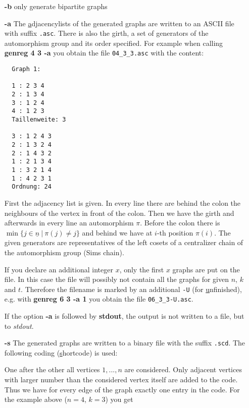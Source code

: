 \documentclass[11pt]{article}
\begin{document}
\begin{itemize}

 \item[\bf -b] only generate bipartite graphs

 \item[\bf -a]
  The \underline{a}djacencylists of the generated graphs are
  written to an ASCII file with suffix \verb|.asc|. There is
  also the girth, a set of generators of the automorphism group
  and its order specified. For example when calling 
  {\bf genreg 4 3 -a} you obtain the file \verb|04_3_3.asc| with the content:
  \begin{verbatim}
  Graph 1:

  1 : 2 3 4
  2 : 1 3 4
  3 : 1 2 4
  4 : 1 2 3
  Taillenweite: 3

  3 : 1 2 4 3
  2 : 1 3 2 4
  2 : 1 4 3 2
  1 : 2 1 3 4
  1 : 3 2 1 4
  1 : 4 2 3 1
  Ordnung: 24 \end{verbatim}
  First the adjacency list is given. In every line there are
  behind the colon the neighbours of the vertex in front
  of the colon. Then we have the girth and afterwards in every
  line an automorphism $\pi$. Before the colon there is 
  $\min\{j \in \underline{n}\ |\ \pi(j)\not=j \}$ and behind
  we have at $i$-th position $\pi(i)$. The given generators
  are representatives of the left cosets of a centralizer chain of the 
  automorphism group (Sims chain).

  If you declare an additional integer $x$, only the first $x$
  graphs are put on the file. In this case the file will
  possibly not contain all the graphs for given $n$, $k$ and $t$.
  Therefore the filename is marked by an additional 
  \verb|-U| (for \underline{u}nfinished),
  e.g. with {\bf genreg 6 3 -a 1} you obtain the file
  \verb|06_3_3-U.asc|.

  If the option {\bf -a} is followed by {\bf stdout}, the output
  is not written to a file, but to {\em stdout}. 
 
 \item[\bf -s]
  The generated graphs are written to a binary file with the suffix
  \verb|.scd|. The following coding (\underline{s}hortcode) is used:

  One after the other all vertices $1,...,n$ are considered. Only
  adjacent vertices with larger number than the considered vertex itself
  are added to the code.
  Thus we have for every edge of the graph exactly
  one entry in the code. For the example above ($n=4$, $k=3$) you
  get 
 
  \hspace{1cm}{\tt 2 3 4 3 4 4} 


\end{itemize}
\end{document}
